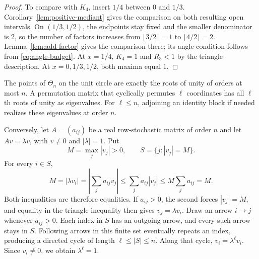 \documentclass[11pt,a4paper]{article}
\theoremstyle{definition}
\theoremstyle{remark}
\numberwithin{equation}{section}
\begin{document}
\begin{proof}
To compare with $K_4$, insert $1/4$ between $0$ and $1/3$. Corollary~\ref{lem:positive-mediant} gives the comparison on both resulting open intervals. On $(1/3,1/2)$, the endpoints stay fixed and the smaller denominator is $2$, so the number of factors increases from $\lfloor3/2\rfloor=1$ to $\lfloor4/2\rfloor=2$. Lemma~\ref{lem:add-factor} gives the comparison there; its angle condition follows from \eqref{eq:angle-budget}. At $x=1/4$, $K_4=1$ and $R_3<1$ by the triangle description. At $x=0,1/3,1/2$, both maxima equal $1$.
\end{proof}

The points of $\Theta_n$ on the unit circle are exactly the roots of unity of orders at most $n$. A permutation matrix that cyclically permutes $\ell$ coordinates has all $\ell$th roots of unity as eigenvalues. For $\ell\le n$, adjoining an identity block if needed realizes these eigenvalues at order $n$.

Conversely, let $A=(a_{ij})$ be a real row-stochastic matrix of order $n$ and let $Av=\lambda v$, with $v\ne0$ and $|\lambda|=1$. Put
\[
 M=\max_j|v_j|>0,\qquad S=\{j:|v_j|=M\}.
\]
For every $i\in S$,
\[
 M=|\lambda v_i|=\left|\sum_j a_{ij}v_j\right|
 \le\sum_j a_{ij}|v_j|\le M\sum_j a_{ij}=M.
\]
Both inequalities are therefore equalities. If $a_{ij}>0$, the second forces $|v_j|=M$, and equality in the triangle inequality then gives $v_j=\lambda v_i$.
Draw an arrow $i\to j$ whenever $a_{ij}>0$. Each index in $S$ has an outgoing arrow, and every such arrow stays in $S$. Following arrows in this finite set eventually repeats an index, producing a directed cycle of length $\ell\le|S|\le n$. Along that cycle, $v_i=\lambda^\ell v_i$. Since $v_i\ne0$, we obtain $\lambda^\ell=1$.
\end{document}
